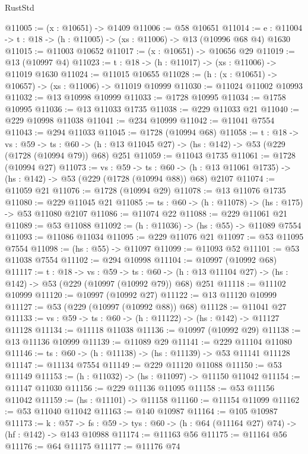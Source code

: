 \begin{lexlean}{RustStd}
\begin{coremodule}
@11005 := (x : @10651) -> @1409
@11006 := @58 @10651
@11014 := {e : @11004} -> {t : @18} -> (h : @11005) -> (xs : @11006) -> @13 (@10996 @68 @4) @1630
@11015 := @11003 @10652
@11017 := (x : @10651) -> @10656 @29
@11019 := @13 (@10997 @4)
@11023 := {t : @18} -> (h : @11017) -> (xs : @11006) -> @11019 @1630
@11024 := @11015 @10655
@11028 := (h : (x : @10651) -> @10657) -> (xs : @11006) -> @11019 @10999
@11030 := @11024 @11002 @10993
@11032 := @13 @10998 @10999
@11033 := @1728 @10995
@11034 := @1758 @10995
@11036 := @13 @11033 @1735
@11038 := @229 @11033 @21
@11040 := @229 @10998 @11038
@11041 := @234 @10999
@11042 := @11041 @7554
@11043 := @294 @11033
@11045 := @1728 (@10994 @68)
@11058 := {t : @18} ->
  {vs : @59} ->
  {ts : @60} -> (h : @13 @11045 @27) -> (hs : @142) -> @53 (@229 (@1728 (@10994 @79)) @68) @251
@11059 := @11043 @1735
@11061 := @1728 (@10994 @27)
@11073 := {vs : @59} ->
  {ts : @60} -> (h : @13 @11061 @1735) -> (hs : @142) -> @53 (@229 (@1728 (@10994 @88)) @68) @2107
@11074 := @11059 @21
@11076 := @1728 (@10994 @29)
@11078 := @13 @11076 @1735
@11080 := @229 @11045 @21
@11085 := {ts : @60} -> (h : @11078) -> (hs : @175) -> @53 @11080 @2107
@11086 := @11074 @22
@11088 := @229 @11061 @21
@11089 := @53 @11088
@11092 := (h : @11036) -> (hs : @55) -> @11089 @7554
@11093 := @11086 @11034
@11095 := @229 @11076 @21
@11097 := @53 @11095 @7554
@11098 := (hs : @55) -> @11097
@11099 := @11093 @52
@11101 := @53 @11038 @7554
@11102 := @294 @10998
@11104 := @10997 (@10992 @68)
@11117 := {t : @18} ->
  {vs : @59} ->
  {ts : @60} -> (h : @13 @11104 @27) -> (hs : @142) -> @53 (@229 (@10997 (@10992 @79)) @68) @251
@11118 := @11102 @10999
@11120 := @10997 (@10992 @27)
@11122 := @13 @11120 @10999
@11127 := @53 (@229 (@10997 (@10992 @88)) @68)
@11128 := @11041 @27
@11133 := {vs : @59} -> {ts : @60} -> (h : @11122) -> (hs : @142) -> @11127 @11128
@11134 := @11118 @11038
@11136 := @10997 (@10992 @29)
@11138 := @13 @11136 @10999
@11139 := @11089 @29
@11141 := @229 @11104 @11080
@11146 := {ts : @60} -> (h : @11138) -> (hs : @11139) -> @53 @11141 @11128
@11147 := @11134 @7554
@11149 := @229 @11120 @11088
@11150 := @53 @11149
@11153 := (h : @11032) -> (hs : @11097) -> @11150 @11042
@11154 := @11147 @11030
@11156 := @229 @11136 @11095
@11158 := @53 @11156 @11042
@11159 := (hs : @11101) -> @11158
@11160 := @11154 @11099
@11162 := @53 @11040 @11042
@11163 := @140 @10987
@11164 := @105 @10987
@11173 := {k : @57} ->
  {fs : @59} -> {tys : @60} -> (h : @64 (@11164 @27) @74) -> (hf : @142) -> @143 @10988
@11174 := @11163 @56
@11175 := @11164 @56
@11176 := @64 @11175
@11177 := @11176 @74

\end{coremodule}
\end{lexlean}
